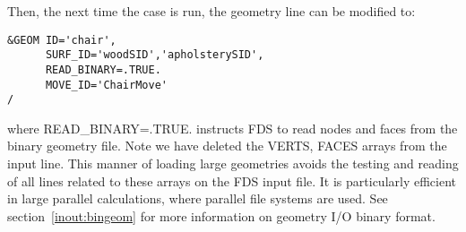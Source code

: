 \documentclass[12pt]{article}
\begin{document}
Then, the next time the case is run, the geometry line can be modified to:
{\small
\begin{verbatim}
&GEOM ID='chair',
      SURF_ID='woodSID','apholsterySID',
      READ_BINARY=.TRUE.
      MOVE_ID='ChairMove'
/
\end{verbatim}
}

where {\ct READ\_BINARY=.TRUE.} instructs FDS to read nodes and faces from the binary geometry file.
Note we have deleted the {\ct VERTS, FACES} arrays from the input line.
This manner of loading large geometries avoids the testing and reading of all lines related to these arrays on the FDS input file.
It is particularly efficient in large parallel calculations, where parallel file systems are used. See section~\ref{inout:bingeom} for more information on geometry I/O binary format.


%
%
%
%
%
%
%
%
\end{document}
